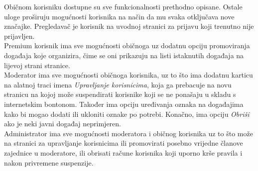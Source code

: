 		\indent Običnom korisniku dostupne su sve funkcionalnosti prethodno opisane. Ostale uloge proširuju mogućnosti korisnika na način da mu svaka otključava nove značajke. Pregledavač je korisnik na uvodnoj stranici za prijavu koji trenutno nije prijavljen. \\
		
		\indent Premium korisnik ima sve mogućnosti običnoga uz dodatnu opciju promoviranja događaja koje organizira, čime se oni prikazuju na listi istaknutih događaja na lijevoj strani stranice. \\
		
		\indent Moderator ima sve mogućnosti običnoga korisnika, uz to što ima dodatnu karticu na alatnoj traci imena \textit{Upravljanje korisnicima}, koja ga prebacuje na novu stranicu na kojoj može suspendirati korisnike koji se ne ponašaju u skladu s internetskim bontonom. Također ima opciju uređivanja oznaka na događajima kako bi mogao dodati ili ukloniti oznake po potrebi. Konačno, ima opciju \textit{Obriši} ako je neki javni događaj neprimjeren. \\
		
		\indent Administrator ima sve mogućnosti moderatora i običnog korisnika uz to što može na stranici za upravljanje korisnicima ili promovirati posebno vrijedne članove zajednice u moderatore, ili obrisati račune korisnika koji uporno krše pravila i nakon privremene suspenzije.
		
		\eject
		
	